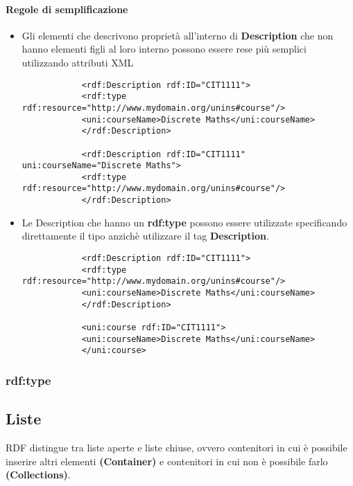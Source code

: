 \paragraph{Regole di semplificazione}
\begin{itemize}
	\item Gli elementi che descrivono proprietà all'interno di \textbf{Description} che non hanno elementi figli al loro interno possono essere rese più semplici utilizzando attributi XML
	\begin{info}[Esempio]
		\begin{verbatim}
			<rdf:Description rdf:ID="CIT1111">
			<rdf:type rdf:resource="http://www.mydomain.org/unins#course"/>
			<uni:courseName>Discrete Maths</uni:courseName>
			</rdf:Description>
			
			<rdf:Description rdf:ID="CIT1111" uni:courseName="Discrete Maths">
			<rdf:type rdf:resource="http://www.mydomain.org/unins#course"/>
			</rdf:Description>
		\end{verbatim}
	\end{info}
	\item Le Description che hanno un \textbf{rdf:type} possono essere utilizzate specificando direttamente il tipo anzichè utilizzare il tag \textbf{Description}.
	\begin{info}[Esempio]
		\begin{verbatim}
			<rdf:Description rdf:ID="CIT1111">
			<rdf:type rdf:resource="http://www.mydomain.org/unins#course"/>
			<uni:courseName>Discrete Maths</uni:courseName>
			</rdf:Description>
			
			<uni:course rdf:ID="CIT1111">
			<uni:courseName>Discrete Maths</uni:courseName>
			</uni:course>
		\end{verbatim}
	\end{info}
\end{itemize}

\subsubsection{rdf:type}

\subsection{Liste}
RDF distingue tra liste aperte e liste chiuse, ovvero contenitori in cui è possibile inserire altri elementi \textbf{(Container)} e contenitori in cui non è possibile farlo \textbf{(Collections)}.

